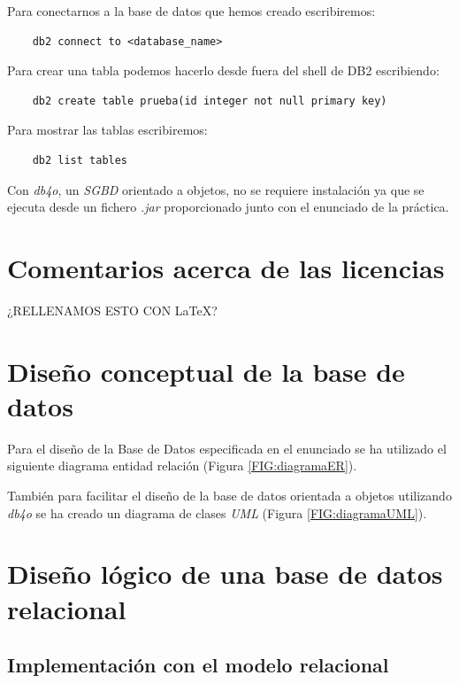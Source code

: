 \documentclass{article}
\begin{document}
Para conectarnos a la base de datos que hemos creado escribiremos:
\begin{lstlisting}
    db2 connect to <database_name>
\end{lstlisting}

Para crear una tabla podemos hacerlo desde fuera del shell de DB2 escribiendo:
\begin{lstlisting}
    db2 create table prueba(id integer not null primary key)
\end{lstlisting}

Para mostrar las tablas escribiremos:
\begin{lstlisting}
    db2 list tables
\end{lstlisting}

Con \emph{db4o}, un \emph{SGBD} orientado a objetos, no se requiere instalación ya que se ejecuta desde un fichero \emph{.jar} proporcionado junto con el enunciado de la práctica.

\section{Comentarios acerca de las licencias}

\begin{Huge}
	¿RELLENAMOS ESTO CON \LaTeX?
\end{Huge}

\section{Diseño conceptual de la base de datos}

Para el diseño de la Base de Datos especificada en el enunciado se ha utilizado el siguiente diagrama entidad relación (Figura \ref{FIG:diagramaER}).

También para facilitar el diseño de la base de datos orientada a objetos utilizando \emph{db4o} se ha creado un diagrama de clases \emph{UML} (Figura \ref{FIG:diagramaUML}).



\section{Diseño lógico de una base de datos relacional}

\subsection{Implementación con el modelo relacional}
\end{document}
